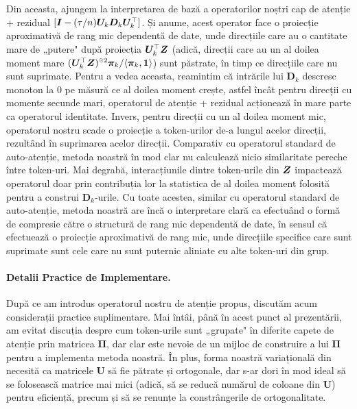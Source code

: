 \documentclass[../../book-main_ro.tex]{subfiles}
\begin{document}
Din aceasta, ajungem la interpretarea de bază a operatorilor noștri cap de atenție + rezidual
$[\bm{I} - (\tau/n)\bm U_{k}\bm D_{k}\bm U_{k}^{\top}]$. Și anume, acest
operator face o proiecție aproximativă de rang mic dependentă de date, unde
direcțiile care au o cantitate mare de „putere" după proiecția $\bm
U_k^\top \bm{Z}$ (adică, direcții care au un al doilea moment mare $(\bm
U_{k}^{\top}\Z)^{\hada 2}\bm \pi_k / \langle \bm \pi_{k}, \bm 1\rangle$) sunt păstrate, în timp ce direcțiile care nu sunt suprimate. Pentru a vedea aceasta, reamintim că intrările lui $\bm D_k$ descresc monoton la 0 pe măsură ce al doilea moment crește, astfel încât pentru direcții cu momente secunde mari, operatorul de atenție + rezidual acționează în mare parte ca operatorul identitate. Invers, pentru direcții cu un al doilea moment mic, operatorul nostru scade o proiecție a token-urilor de-a lungul acelor direcții, rezultând în suprimarea acelor direcții. Comparativ cu operatorul standard de auto-atenție, metoda noastră în mod clar nu calculează nicio similaritate pereche între token-uri. Mai degrabă, interacțiunile dintre token-urile din $\bm{Z}$ impactează operatorul doar prin contribuția lor la statistica de al doilea moment folosită pentru a construi $\bm D_{k}$-urile. Cu toate acestea, similar cu operatorul standard de auto-atenție, metoda noastră are încă o interpretare clară ca efectuând o formă de compresie către o structură de rang mic dependentă de date, în sensul că efectuează o proiecție aproximativă de rang mic, unde direcțiile specifice care sunt suprimate sunt cele care nu sunt puternic aliniate cu alte token-uri din grup.

\paragraph{Detalii Practice de Implementare.} După ce am introdus operatorul nostru de atenție propus, discutăm acum considerații practice suplimentare. Mai întâi, până în acest punct al prezentării, am evitat discuția despre cum token-urile sunt „grupate" în diferite capete de atenție prin matricea $\bm\Pi$, dar clar este nevoie de un mijloc de construire a lui $\bm\Pi$ pentru a implementa metoda noastră. În plus, forma noastră variațională din  necesită ca matricele $\bm U$ să fie pătrate și ortogonale, dar s-ar dori în mod ideal să se folosească matrice mai mici (adică, să se reducă numărul de coloane din $\bm U$) pentru eficiență, precum și să se renunțe la constrângerile de ortogonalitate.
\end{document}

